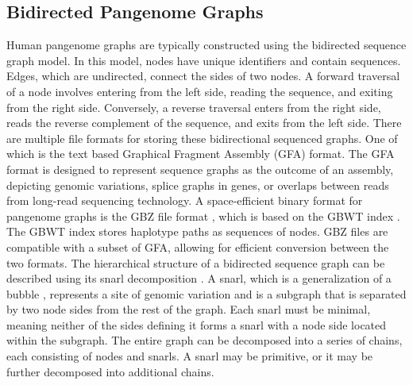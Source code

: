 \documentclass[11pt]{ucthesis}
\begin{document}
\subsection{Bidirected Pangenome Graphs}
Human pangenome graphs are typically constructed using the bidirected sequence graph model. In this model, nodes have unique identifiers and contain sequences. Edges, which are undirected, connect the sides of two nodes. A forward traversal of a node involves entering from the left side, reading the sequence, and exiting from the right side. Conversely, a reverse traversal enters from the right side, reads the reverse complement of the sequence, and exits from the left side.
There are multiple file formats for storing these bidirectional sequenced graphs. One of which is the text based Graphical Fragment Assembly (GFA) format. The GFA format is designed to represent sequence graphs as the outcome of an assembly, depicting genomic variations, splice graphs in genes, or overlaps between reads from long-read sequencing technology. A space-efficient binary format for pangenome graphs is the GBZ file format \cite{siren2022gbz}, which is based on the GBWT index \cite{siren2020haplotype}. The GBWT index stores haplotype paths as sequences of nodes. GBZ files are compatible with a subset of GFA, allowing for efficient conversion between the two formats.
The hierarchical structure of a bidirected sequence graph can be described using its snarl decomposition \cite{paten2018superbubbles}. A snarl, which is a generalization of a bubble \cite{zerbino2008velvet}, represents a site of genomic variation and is a subgraph that is separated by two node sides from the rest of the graph. Each snarl must be minimal, meaning neither of the sides defining it forms a snarl with a node side located within the subgraph. The entire graph can be decomposed into a series of chains, each consisting of nodes and snarls. A snarl may be primitive, or it may be further decomposed into additional chains.
\end{document}
